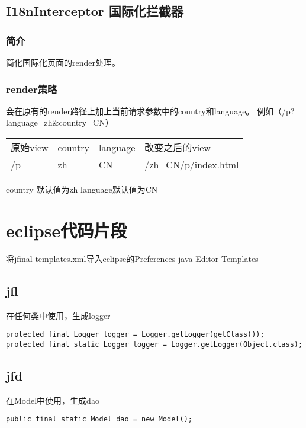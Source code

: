 \documentclass{scrartcl}
\begin{document}
\subsection{I18nInterceptor 国际化拦截器}
\label{sec-5-2}
\subsubsection{简介}
\label{sec-5-2-1}

    简化国际化页面的render处理。
\subsubsection{render策略}
\label{sec-5-2-2}

   会在原有的render路径上加上当前请求参数中的country和language。
   例如（/p?language=zh\&country=CN）

\begin{tabular}{llll}
 原始view  &  country  &  language  &  改变之后的view       \\
 /p        &  zh       &  CN        &  /zh_CN/p/index.html  \\
\end{tabular}


country 默认值为zh language默认值为CN
\section{eclipse代码片段}
\label{sec-6}

 将jfinal-templates.xml导入eclipse的Preferences-java-Editor-Templates
\subsection{jfl}
\label{sec-6-1}

   在任何类中使用，生成logger
  

\begin{verbatim}
protected final Logger logger = Logger.getLogger(getClass());
protected final static Logger logger = Logger.getLogger(Object.class);
\end{verbatim}
\subsection{jfd}
\label{sec-6-2}

   在Model中使用，生成dao


\begin{verbatim}
public final static Model dao = new Model();
\end{verbatim}
\end{document}

